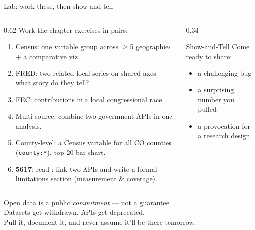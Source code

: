 \documentclass[9pt,aspectratio=169]{beamer}
\begin{document}
\begin{frame}{Lab: work these, then show-and-tell}
    \begin{columns}[T]
        \begin{column}{0.62\textwidth}
            Work the chapter exercises in pairs:
            \begin{enumerate}\small
                \item Census: one variable group across $\geq$5 geographies + a comparative viz.
                \item FRED: two related local series on shared axes --- what story do they tell?
                \item FEC: contributions in a local congressional race.
                \item Multi-source: combine two government APIs in one analysis.
                \item County-level: a Census variable for all CO counties (\texttt{county:*}), top-20 bar chart.
                \item[6.] \textcolor{tab-purple}{\textbf{5617}}: read \textcite{lazer2020computational}; link two APIs and write a formal limitations section (measurement \& coverage).
            \end{enumerate}
        \end{column}
        \begin{column}{0.34\textwidth}
            \begin{block}{Show-and-Tell}
                \footnotesize Come ready to share:
                \begin{itemize}\footnotesize
                    \item a challenging bug
                    \item a surprising number you pulled
                    \item a provocation for a research design
                \end{itemize}
            \end{block}
        \end{column}
    \end{columns}
\end{frame}

\begin{frame}[standout]
    Open data is a public \textit{commitment} --- not a guarantee.\\
    Datasets get withdrawn. APIs get deprecated.\\[1em]
    {\large Pull it, document it, and never assume it'll be there tomorrow.}
\end{frame}
\end{document}
